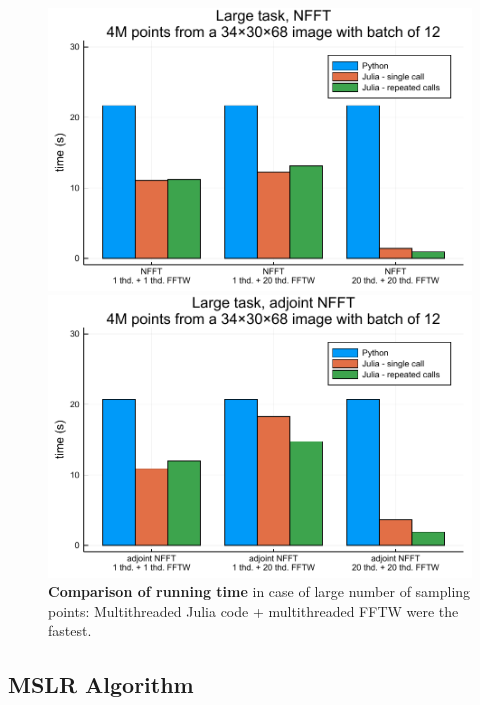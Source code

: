\begin{figure}[htbp]
    \centering
    \begin{minipage}{0.48\linewidth}
        \centering
        \includegraphics[width=\linewidth]{images/nfft_large_forw.pdf}
    \end{minipage}
    \begin{minipage}{0.48\linewidth}
        \centering
        \includegraphics[width=\linewidth]{images/nfft_large_backw.pdf}
    \end{minipage}
    \caption{\textbf{Comparison of running time} in case of large number of sampling points: Multithreaded Julia code + multithreaded FFTW were the fastest.}
    \label{fig:nfft_large}
\end{figure}

\subsection{MSLR Algorithm}

